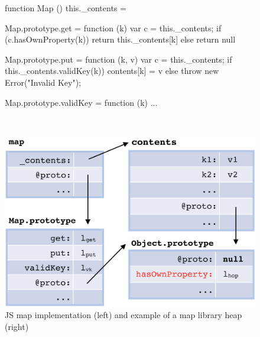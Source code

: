  \begin{figure}[t!]
 \begin{minipage}{0.56\textwidth}
 \begin{lstjs}[firstnumber=1]
function Map () { this._contents = {} }

Map.prototype.get = function (k) {
  var c = this._contents;
  if (c.hasOwnProperty(k)) {
    return this._contents[k] 
  } else { return null }
}

Map.prototype.put = function (k, v) {
  var c = this._contents;
  if this._contents.validKey(k)) {  
    contents[k] = v   
  } else
    throw new Error("Invalid Key");
} 

Map.prototype.validKey = function (k) { ... }
\end{lstjs}
\end{minipage}
\ 
 \begin{minipage}{0.43\textwidth}
 \vspace*{-0.3cm}
 \hspace*{-1.2cm}
 \includegraphics[width=1.2\textwidth]{figures/mapDiagram.png}
 \end{minipage}
\vspace*{-0.3cm}
\caption{JS map implementation (left) and example of a map library heap (right) \label{map:example}}
\end{figure}

